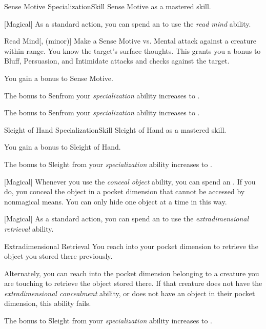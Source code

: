     \begin{feat}{Sense Motive Specialization}{Skill}
        \featpre Sense Motive as a mastered skill.

        [Magical] As a standard action, you can spend an  to use the \textit{read mind} ability.
        \begin{ability}{Read Mind}[,  (minor)]
            Make a Sense Motive vs. Mental attack against a creature within \rngclose range.
            \hit You know the target's surface thoughts.
            This grants you a  bonus to Bluff, Persuasion, and Intimidate attacks and checks against the target.
        \end{ability}

         You gain a  bonus to Sense Motive.

         The bonus to Senfrom your \textit{specialization} ability increases to .

         The bonus to Senfrom your \textit{specialization} ability increases to .
    \end{feat}

    \begin{feat}{Sleight of Hand Specialization}{Skill}
        \featpre Sleight of Hand as a mastered skill.

        \ff{}

         You gain a  bonus to Sleight of Hand.

         The bonus to Sleight from your \textit{specialization} ability increases to .

        [Magical] Whenever you use the \textit{conceal object} ability, you can spend an .
        If you do, you conceal the object in a pocket dimension that cannot be accessed by nonmagical means.
        You can only hide one object at a time in this way.

        [Magical] As a standard action, you can spend an  to use the \textit{extradimensional retrieval} ability.
        \begin{ability}{Extradimensional Retrieval}
            You reach into your pocket dimension to retrieve the object you stored there previously.

            Alternately, you can reach into the pocket dimension belonging to a creature you are touching to retrieve the object stored there.
            If that creature does not have the \textit{extradimensional concealment} ability, or does not have an object in their pocket dimension, this ability fails.
        \end{ability}

         The bonus to Sleight from your \textit{specialization} ability increases to .
    \end{feat}

